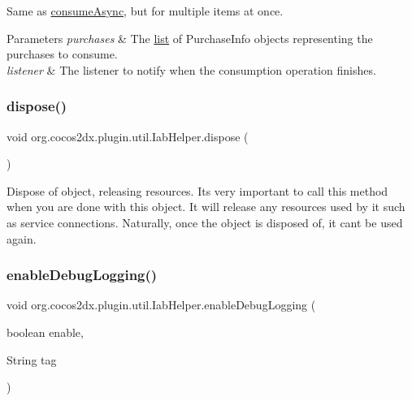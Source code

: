 Same as \hyperlink{classorg_1_1cocos2dx_1_1plugin_1_1util_1_1IabHelper_aebe7d5a554683f1d09ef7bdc19d6046e}{consume\+Async}, but for multiple items at once. 
\begin{DoxyParams}{Parameters}
{\em purchases} & The \hyperlink{protocollist-p}{list} of Purchase\+Info objects representing the purchases to consume. \\
\hline
{\em listener} & The listener to notify when the consumption operation finishes. \\
\hline
\end{DoxyParams}
\mbox{\label{classorg_1_1cocos2dx_1_1plugin_1_1util_1_1IabHelper_add41920802456afa1594822fc5e4b93d}} 
\subsubsection{\texorpdfstring{dispose()}{dispose()}}
{\footnotesize\ttfamily void org.\+cocos2dx.\+plugin.\+util.\+Iab\+Helper.\+dispose (\begin{DoxyParamCaption}{ }\end{DoxyParamCaption})\hspace{0.3cm}{\ttfamily [inline]}}

Dispose of object, releasing resources. It\textquotesingle{}s very important to call this method when you are done with this object. It will release any resources used by it such as service connections. Naturally, once the object is disposed of, it can\textquotesingle{}t be used again. \mbox{\label{classorg_1_1cocos2dx_1_1plugin_1_1util_1_1IabHelper_ac452c2ebaa245349df0a1a49f67f918d}} 
\subsubsection{\texorpdfstring{enable\+Debug\+Logging()}{enableDebugLogging()}}
{\footnotesize\ttfamily void org.\+cocos2dx.\+plugin.\+util.\+Iab\+Helper.\+enable\+Debug\+Logging (\begin{DoxyParamCaption}\item[{boolean}]{enable,  }\item[{String}]{tag }\end{DoxyParamCaption})\hspace{0.3cm}{\ttfamily [inline]}}

